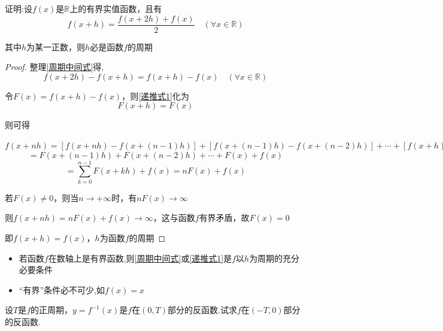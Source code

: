 \begin{example}
    证明:设$f(x)$是$\mathbb{R}$上的有界实值函数，且有
    \begin{equation}
        f(x+h)=\frac{f(x+2h)+f(x)}{2} \quad (\forall x\in \mathbb{R})   \label{周期中间式}
    \end{equation}

    其中$h$为某一正数，则$h$必是函数$f$的周期
\end{example}

\begin{proof}

    整理\cref{周期中间式}得,
    \begin{equation}
        f(x+2h)-f(x+h)=f(x+h)-f(x)\quad(\forall x\in \mathbb{R})    \label{递推式1}
    \end{equation}

    令$F(x)=f(x+h)-f(x)$，则\cref{递推式1}化为
    \begin{equation}
        F(x+h)=F(x)
    \end{equation}

    则可得

    $f(x+nh)=[f(x+nh)-f(x+(n-1)h)]+[f(x+(n-1)h)-f(x+(n-2)h)]+\cdots+[f(x+h)-f(x)]+f(x)$
    $$=F(x+(n-1)h)+F(x+(n-2)h)+\cdots+F(x)+f(x)$$
    \begin{equation*}
        =\sum_{k=0}^{n-1}F(x+kh)+f(x)=nF(x)+f(x)
    \end{equation*}

    若$F(x)\ne 0$，则当$n\to +\infty$时，有$nF(x)\to \infty$

    则$f(x+nh)=nF(x)+f(x)\to \infty$，这与函数$f$有界矛盾，故$F(x)=0$

    即$f(x+h)=f(x)$，$h$为函数$f$的周期
\end{proof}

\begin{note}
    \begin{itemize}
        \item 若函数$f$在数轴上是有界函数,则\cref{周期中间式}或\cref{递推式1}是$f$以$h$为周期的充分必要条件
        \item “有界”条件必不可少,如$f(x)=x$
    \end{itemize}
\end{note}

\begin{example}\label{exer:周期例题}
    设$T$是$f$的正周期，$y=f^{-1}(x)$是$f$在$(0,T)$部分的反函数.试求$f$在$(-T,0)$部分的反函数.
\end{example}

